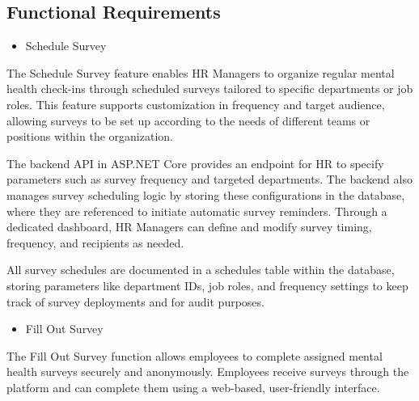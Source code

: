 \documentclass[conference]{IEEEtran}
\begin{document}
        \subsection {Functional Requirements}
   
            \begin{itemize}
                \item Schedule Survey 
            \end{itemize}

            The Schedule Survey feature enables HR Managers to organize 
            regular mental health check-ins through scheduled surveys 
            tailored to specific departments or job roles. This feature 
            supports customization in frequency and target audience, 
            allowing surveys to be set up according to the needs of 
            different teams or positions within the organization. 
            \newline

            The backend API in ASP.NET Core provides an endpoint for HR to 
            specify parameters such as survey frequency and targeted 
            departments. The backend also manages survey scheduling 
            logic by storing these configurations in the database, where 
            they are referenced to initiate automatic survey reminders. 
            Through a dedicated dashboard, HR Managers can define and 
            modify survey timing, frequency, and recipients as needed. 
            \newline
        
            All survey schedules are documented in a schedules table 
            within the database, storing parameters like department IDs, 
            job roles, and frequency settings to keep track of survey 
            deployments and for audit purposes.
            \newline
           
            \begin{itemize}
                \item Fill Out Survey 
            \end{itemize}
        
            The Fill Out Survey function allows employees to complete 
            assigned mental health surveys securely and anonymously. 
            Employees receive surveys through the platform and can complete them using a web-based, user-friendly interface. 
            \newline
            
\end{document}
